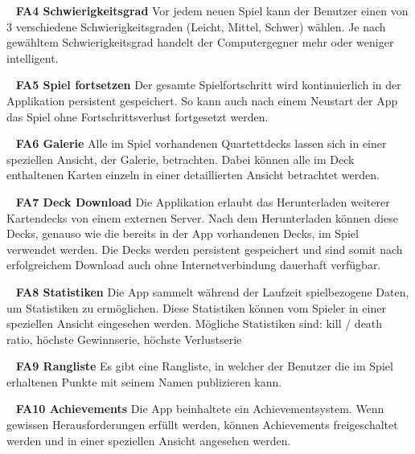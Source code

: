 \documentclass{scrartcl}
\begin{document}
\ \newline
\textbf{FA4 Schwierigkeitsgrad} \newline
Vor jedem neuen Spiel kann der Benutzer einen von 3 verschiedene
Schwierigkeitsgraden (Leicht, Mittel, Schwer) wählen. Je nach gewähltem
Schwierigkeitsgrad handelt der Computergegner mehr oder weniger intelligent.

\ \newline
\textbf{FA5 Spiel fortsetzen} \newline
Der gesamte Spielfortschritt wird kontinuierlich in der Applikation persistent
gespeichert. So kann auch nach einem Neustart der App das Spiel ohne
Fortschrittsverlust fortgesetzt werden.

\ \newline
\textbf{FA6 Galerie} \newline
Alle im Spiel vorhandenen Quartettdecks lassen sich in einer speziellen Ansicht,
der Galerie, betrachten. Dabei können alle im Deck enthaltenen Karten einzeln
in einer detaillierten Ansicht betrachtet werden.

\ \newline
\textbf{FA7 Deck Download} \newline
Die Applikation erlaubt das Herunterladen weiterer Kartendecks von einem
externen Server. Nach dem Herunterladen können diese Decks, genauso wie die
bereits in der App vorhandenen Decks, im Spiel verwendet werden. Die Decks werden
persistent gespeichert und sind somit nach erfolgreichem Download auch ohne
Internetverbindung dauerhaft verfügbar.

\ \newline
\textbf{FA8 Statistiken} \newline
Die App sammelt während der Laufzeit spielbezogene Daten, um Statistiken zu
ermöglichen. Diese Statistiken können vom Spieler in einer speziellen Ansicht
eingesehen werden. Mögliche Statistiken sind: kill / death ratio, höchste
Gewinnserie, höchste Verlustserie

\ \newline
\textbf{FA9 Rangliste} \newline
Es gibt eine Rangliste, in welcher der Benutzer die im Spiel erhaltenen Punkte
mit seinem Namen publizieren kann.

\ \newline
\textbf{FA10 Achievements} \newline
Die App beinhaltete ein Achievementsystem. Wenn gewissen Herausforderungen
erfüllt werden, können Achievements freigeschaltet werden und in einer
speziellen Ansicht angesehen werden.
\end{document}
